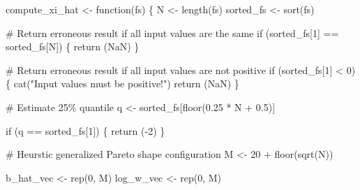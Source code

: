 \documentclass[
  letterpaper,
  DIV=11,
  numbers=noendperiod]{scrartcl}
\newenvironment{Shaded}{\begin{snugshade}}{\end{snugshade}}
\newcommand{\CommentTok}[1]{\textcolor[rgb]{0.37,0.37,0.37}{#1}}
\newcommand{\ConstantTok}[1]{\textcolor[rgb]{0.56,0.35,0.01}{#1}}
\newcommand{\ControlFlowTok}[1]{\textcolor[rgb]{0.00,0.23,0.31}{#1}}
\newcommand{\DecValTok}[1]{\textcolor[rgb]{0.68,0.00,0.00}{#1}}
\newcommand{\FloatTok}[1]{\textcolor[rgb]{0.68,0.00,0.00}{#1}}
\newcommand{\FunctionTok}[1]{\textcolor[rgb]{0.28,0.35,0.67}{#1}}
\newcommand{\NormalTok}[1]{\textcolor[rgb]{0.00,0.23,0.31}{#1}}
\newcommand{\OtherTok}[1]{\textcolor[rgb]{0.00,0.23,0.31}{#1}}
\newcommand{\SpecialCharTok}[1]{\textcolor[rgb]{0.37,0.37,0.37}{#1}}
\newcommand{\StringTok}[1]{\textcolor[rgb]{0.13,0.47,0.30}{#1}}
\begin{document}
\begin{Shaded}
\begin{Highlighting}[]
\NormalTok{compute\_xi\_hat }\OtherTok{\textless{}{-}} \ControlFlowTok{function}\NormalTok{(fs) \{}
\NormalTok{  N }\OtherTok{\textless{}{-}} \FunctionTok{length}\NormalTok{(fs)}
\NormalTok{  sorted\_fs }\OtherTok{\textless{}{-}} \FunctionTok{sort}\NormalTok{(fs)}

  \CommentTok{\# Return erroneous result if all input values are the same }
  \ControlFlowTok{if}\NormalTok{ (sorted\_fs[}\DecValTok{1}\NormalTok{] }\SpecialCharTok{==}\NormalTok{ sorted\_fs[N]) \{}
    \FunctionTok{return}\NormalTok{ (}\ConstantTok{NaN}\NormalTok{)}
\NormalTok{  \}}

  \CommentTok{\# Return erroneous result if all input values are not positive}
  \ControlFlowTok{if}\NormalTok{ (sorted\_fs[}\DecValTok{1}\NormalTok{] }\SpecialCharTok{\textless{}} \DecValTok{0}\NormalTok{) \{}
    \FunctionTok{cat}\NormalTok{(}\StringTok{"Input values must be positive!"}\NormalTok{)}
    \FunctionTok{return}\NormalTok{ (}\ConstantTok{NaN}\NormalTok{)}
\NormalTok{  \}}

  \CommentTok{\# Estimate 25\% quantile}
\NormalTok{  q }\OtherTok{\textless{}{-}}\NormalTok{ sorted\_fs[}\FunctionTok{floor}\NormalTok{(}\FloatTok{0.25} \SpecialCharTok{*}\NormalTok{ N }\SpecialCharTok{+} \FloatTok{0.5}\NormalTok{)]}

  \ControlFlowTok{if}\NormalTok{ (q }\SpecialCharTok{==}\NormalTok{ sorted\_fs[}\DecValTok{1}\NormalTok{]) \{}
    \FunctionTok{return}\NormalTok{ (}\SpecialCharTok{{-}}\DecValTok{2}\NormalTok{)}
\NormalTok{  \}}

  \CommentTok{\# Heurstic generalized Pareto shape configuration}
\NormalTok{  M }\OtherTok{\textless{}{-}} \DecValTok{20} \SpecialCharTok{+} \FunctionTok{floor}\NormalTok{(}\FunctionTok{sqrt}\NormalTok{(N))}

\NormalTok{  b\_hat\_vec }\OtherTok{\textless{}{-}} \FunctionTok{rep}\NormalTok{(}\DecValTok{0}\NormalTok{, M)}
\NormalTok{  log\_w\_vec }\OtherTok{\textless{}{-}} \FunctionTok{rep}\NormalTok{(}\DecValTok{0}\NormalTok{, M)}


\end{Highlighting}
\end{Shaded}
\end{document}
